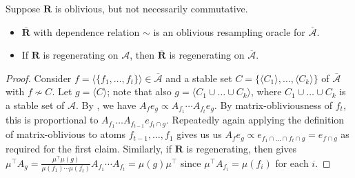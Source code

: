 \documentclass{toc}
\newcommand\oa{\overline{\mathcal A}}
\newcommand\obr{\overline{\mathbf R}}
\begin{document}
\begin{theorem}
  Suppose  $\mathbf R$  is oblivious, but not necessarily commutative. 
  \begin{itemize}
  \item $\obr$ with dependence relation $\sim$ is an oblivious resampling oracle for $\oa$.
  \item If $\mathbf R$  is regenerating on $\mathcal A$, then $\obr$ is regenerating on $\oa$.
  \end{itemize}
\end{theorem}
\begin{proof}
Consider $f = \langle \{ f_1, \dots, f_t \} \rangle \in \oa$ and a stable set $C = \{ \langle C_1 \rangle, \dots, \langle C_k \rangle \}$ of $\oa$ with $f \not \sim C$. Let $g = \langle C \rangle$; note that also $g = \langle C_1 \cup \dots \cup C_k \rangle$, where $C_1 \cup \dots \cup C_k$ is a stable set of $\mathcal A$.  By , we have $A_f e_g \propto A_{f_1} \cdots A_{f_t} e_g$. By matrix-obliviousness of $f_t$, this is proportional to $A_{f_1} \dots A_{f_{t-1}} e_{f_t \cap g}$. Repeatedly again applying the definition of matrix-oblivious to atoms $f_{t-1}, \dots, f_1$ gives us us $A_f e_g \propto e_{f_1 \cap \dots \cap f_t  \cap g} = e_{f \cap g}$ as required for the first claim. Similarly, if $\mathbf R$ is regenerating, then  gives $
\mu^{\top} A_g = \frac{ \mu^{\top} \mu(g) }{\mu(f_1) \cdots \mu(f_t)} A_{f_1} \cdots A_{f_t} = \mu(g) \mu^{\top}
$
since $\mu^{\top} A_{f_i} = \mu(f_i)$ for each $i$.
\end{proof}
  
\end{document}
